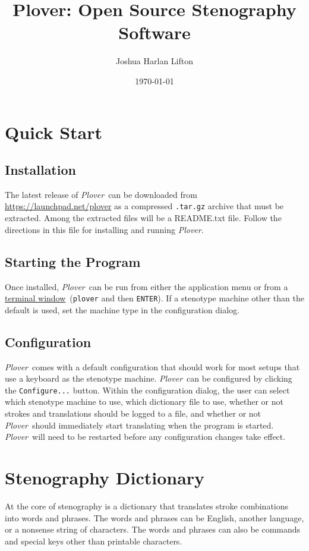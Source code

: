 \documentclass[11pt]{article}
\newcommand{\plover}{\emph{Plover}}
\newcommand{\code}[1]{\texttt{#1}}
\newcommand{\terminal}{\href{https://help.ubuntu.com/community/UsingTheTerminal}{terminal window}}
\begin{document}
\setlength{\parindent}{0pt} %

\title{Plover: Open Source Stenography Software}
\author{Joshua Harlan Lifton}
\date{\today}

\maketitle

\section{Quick Start}

\subsection{Installation}
The latest release of \plover~can be downloaded from
\url{https://launchpad.net/plover} as a compressed \code{.tar.gz}
archive that must be extracted. Among the extracted files will be a
README.txt file. Follow the directions in this file for installing and
running \plover.

\subsection{Starting the Program}
Once installed, \plover~can be run from either the application menu or
from a \terminal~(\code{plover} and then \code{ENTER}). If a stenotype
machine other than the default is used, set the machine type in the
configuration dialog.

\subsection{Configuration}
\label{config}

\plover~comes with a default configuration that should work for most
setups that use a keyboard as the stenotype machine. \plover~can be
configured by clicking the \code{Configure...} button. Within the
configuration dialog, the user can select which stenotype machine to
use, which dictionary file to use, whether or not strokes and
translations should be logged to a file, and whether or not
\plover~should immediately start translating when the program is
started. \plover~will need to be restarted before any configuration
changes take effect.

\section{Stenography Dictionary}
At the core of stenography is a dictionary that translates stroke
combinations into words and phrases. The words and phrases can be
English, another language, or a nonsense string of characters. The
words and phrases can also be commands and special keys other than
printable characters.
\end{document}
